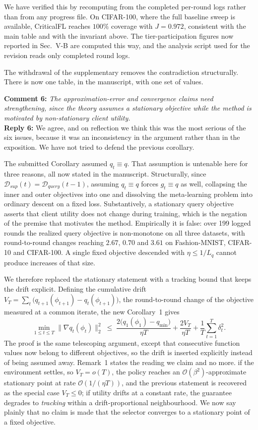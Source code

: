 \documentclass[10pt]{article}
\begin{document}
We have verified this by recomputing from the completed per-round logs rather than from any progress file. On CIFAR-100, where the full baseline sweep is available, CriticalFL reaches $100\%$ coverage with $J=0.972$, consistent with the main table and with the invariant above. The tier-participation figures now reported in Sec.~V-B are computed this way, and the analysis script used for the revision reads only completed round logs.

The withdrawal of the supplementary removes the contradiction structurally. There is now one table, in the manuscript, with one set of values.

\vspace{0.5em}
\noindent
\textbf{Comment 6:} \textit{The approximation-error and convergence claims need strengthening, since the theory assumes a stationary objective while the method is motivated by non-stationary client utility.}\\
\noindent
\textbf{Reply 6:} We agree, and on reflection we think this was the most serious of the six issues, because it was an inconsistency in the argument rather than in the exposition. We have not tried to defend the previous corollary.

The submitted Corollary assumed $q_t\equiv q$. That assumption is untenable here for three reasons, all now stated in the manuscript. Structurally, since $\mathcal{D}_{sup}(t)=\mathcal{D}_{query}(t-1)$, assuming $q_t\equiv q$ forces $g_t\equiv q$ as well, collapsing the inner and outer objectives into one and dissolving the meta-learning problem into ordinary descent on a fixed loss. Substantively, a stationary query objective asserts that client utility does not change during training, which is the negation of the premise that motivates the method. Empirically it is false: over 199 logged rounds the realized query objective is non-monotone on all three datasets, with round-to-round changes reaching $2.67$, $0.70$ and $3.61$ on Fashion-MNIST, CIFAR-10 and CIFAR-100. A single fixed objective descended with $\eta\le 1/L_q$ cannot produce increases of that size.

We therefore replaced the stationary statement with a tracking bound that keeps the drift explicit. Defining the cumulative drift $V_T=\sum_t\bigl(q_{t+1}(\phi_{t+1})-q_t(\phi_{t+1})\bigr)$, the round-to-round change of the objective measured at a common iterate, the new Corollary~1 gives
\[
\min_{1\le t\le T}\lVert\nabla q_t(\phi_t)\rVert_2^2\;\le\;\frac{2\bigl(q_1(\phi_1)-q_{\min}\bigr)}{\eta T}+\frac{2V_T}{\eta T}+\frac{1}{T}\sum_{t=1}^{T}\delta_t^2 .
\]
The proof is the same telescoping argument, except that consecutive function values now belong to different objectives, so the drift is inserted explicitly instead of being assumed away. Remark~1 states the reading we claim and no more. if the environment settles, so $V_T=o(T)$, the policy reaches an $\mathcal{O}(\beta^2)$-approximate stationary point at rate $\mathcal{O}(1/(\eta T))$, and the previous statement is recovered as the special case $V_T\le 0$; if utility drifts at a constant rate, the guarantee degrades to \emph{tracking} within a drift-proportional neighbourhood. We now say plainly that no claim is made that the selector converges to a stationary point of a fixed objective.
\end{document}
